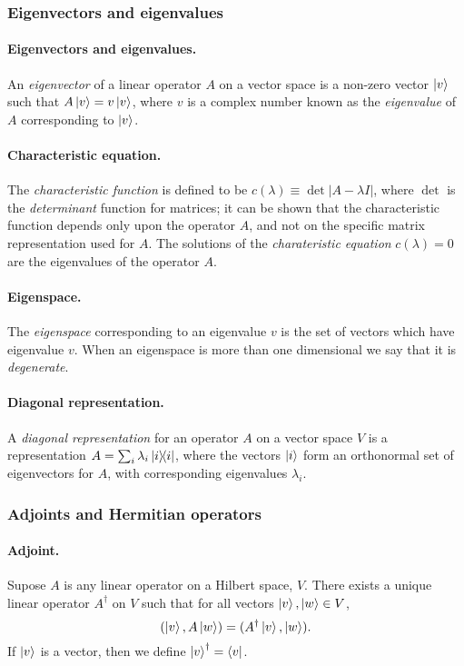 \documentclass{article}
\numberwithin{theorem}{section}
\numberwithin{corollary}{section}
\begin{document}
\subsubsection{Eigenvectors and eigenvalues}

\paragraph{Eigenvectors and eigenvalues.} An \emph{eigenvector} of a linear
operator $A$ on a vector space is a non-zero vector $\ket{v}$ such that
$A\ket{v} = v\ket{v}$, where $v$ is a complex number known as the
\emph{eigenvalue} of $A$ corresponding to $\ket{v}$.

\paragraph{Characteristic equation.} The \emph{characteristic function} is
defined to be $c(\lambda) \equiv \det|A - \lambda I|$, where $\det$ is the
\emph{determinant} function for matrices; it can be shown that the
characteristic function depends only upon the operator $A$, and not on the
specific matrix representation used for $A$. The solutions of the
\emph{charateristic equation} $c(\lambda) = 0$ are the eigenvalues of the
operator $A$.

\paragraph{Eigenspace.} The \emph{eigenspace} corresponding to an eigenvalue
$v$ is the set of vectors which have eigenvalue $v$. When an eigenspace is more
than one dimensional we say that it is \emph{degenerate}.

\paragraph{Diagonal representation.} A \emph{diagonal representation} for an
operator $A$ on a vector space $V$ is a representation $A = \sum_i
\lambda_i\op{i}{i}$, where the vectors $\ket{i}$ form an orthonormal set of
eigenvectors for $A$, with corresponding eigenvalues $\lambda_i$.

\subsubsection{Adjoints and Hermitian operators}

\paragraph{Adjoint.} Supose $A$ is any linear operator on a Hilbert space, $V$.
There exists a unique linear operator $A^{\dagger}$ on $V$ such that for all
vectors $\ket{v}, \ket{w} \in V$, \[
  (\ket{v}, A\ket{w}) = (A^{\dagger}\ket{v}, \ket{w}).
\] If $\ket{v}$ is a vector, then we define $\ket{v}^{\dagger} = \bra{v}$.
\end{document}
